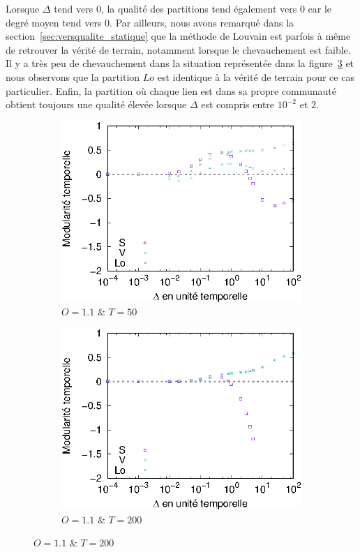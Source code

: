 Lorsque $\Delta$ tend vers $0$, la qualité des partitions tend également vers $0$ car le degré moyen tend vers $0$.
Par ailleurs, nous avons remarqué dans la section~\ref{sec:versqualite_statique} que la méthode de Louvain est parfois à même de retrouver la vérité de terrain, notamment lorsque le chevauchement est faible.
Il y a très peu de chevauchement dans la situation représentée dans la figure~\ref{fig:versqualite_fonc_test2} et nous observons que la partition $Lo$ est identique à la vérité de terrain pour ce cas particulier.
Enfin, la partition où chaque lien est dans sa propre communauté obtient toujours une qualité élevée lorsque $\Delta$ est compris entre $10^{-2}$ et $2$.


\begin{figure}[h]
\centering
	\begin{subfigure}{0.495\textwidth}
		\includegraphics[width=\textwidth]{img/Qualite/Fonc/comp_1_T_50_O_1_1_Q_1.eps}
		\caption{$O=1.1$ \& $T=50$}
		\label{fig:versqualite_fonc_test1}
	\end{subfigure}
	\begin{subfigure}{0.495\textwidth}
		\includegraphics[width=\textwidth]{img/Qualite/Fonc/comp_0_1_T_200_O_1_1_Q_1.eps}
		\caption{$O=1.1$ \& $T=200$}
		\label{fig:versqualite_fonc_test2}
	\end{subfigure}
	

\end{figure}
